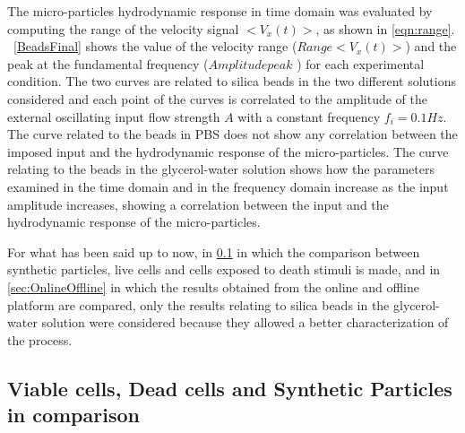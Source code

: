 \documentclass[journal]{IEEEtran}
\theoremstyle{definition}
\theoremstyle{remark}
\begin{document}
The micro-particles hydrodynamic response in time domain was evaluated by computing the range of the velocity signal $<V_x(t)>$, as shown in \eqn \ref{eqn:range}. ~\fig\ref{BeadsFinal} shows the value of the velocity range ($Range<V_x(t)>$) and the peak at the fundamental frequency ($Amplitude peak$ ) for each experimental condition. The two curves are related to silica beads in the two different solutions considered and each point of the curves is correlated to the amplitude of the external oscillating input flow strength $A$ with a constant frequency $f_i= 0.1 Hz$. 
\\The curve related to the beads in PBS does not show any correlation between the imposed input and the hydrodynamic response of the micro-particles. The curve relating to the beads in the glycerol-water solution shows how the parameters examined in the time domain and in the frequency domain increase as the input amplitude increases, showing a correlation between the input and the hydrodynamic response of the micro-particles.

For what has been said up to now, in \sect\ref{sec:comparison} in which the comparison between synthetic particles, live cells and cells exposed to death stimuli is made, and in \sect\ref{sec:OnlineOffline} in which the results obtained from the online and offline platform are compared, only the results relating to silica beads in the glycerol-water solution were considered because they allowed a better characterization of the process.

\subsection{Viable cells, Dead cells and Synthetic Particles in comparison}\label{sec:comparison}
\end{document}
